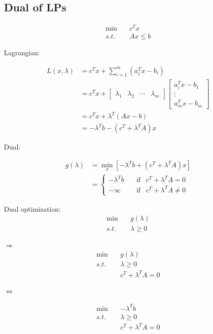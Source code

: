 

\subsection{Dual of LPs}

\begin{align*}
\min\quad &c^Tx\\
s.t.\quad &Ax\leq b
\end{align*}

Lagrangian: 

\begin{align*}
L(x,\lambda) &= c^Tx + \sum^m_{i=1}(a_i^Tx-b_i)\\
&= c^Tx+\begin{bmatrix}
\lambda_1&\lambda_2&\cdots&\lambda_m
\end{bmatrix}\begin{bmatrix}
a_i^Tx-b_1\\
\vdots\\
a_m^Tx-b_m
\end{bmatrix} \\
&=c^Tx+\lambda^T(Ax-b)\\
&= -\lambda^Tb-(c^T+\lambda^TA)x
\end{align*}

Dual:

\begin{align*}
g(\lambda) &= \min_x[-\lambda^Tb+(c^T+\lambda^TA)x]\\
&=
\label{eq6}
\left\{
\begin{aligned}
-\lambda^Tb &\quad \text{if} & c^T+\lambda^TA=0 \\
-\infty &\quad \text{if} & c^T+\lambda^TA\neq 0
\end{aligned}
\right.
\end{align*}

Dual optimization:
\begin{align*}
\min\quad &g(\lambda)\\
s.t.\quad &\lambda \geq 0
\end{align*}

$\Rightarrow$
\begin{align*}
\min\quad &g(\lambda)\\
s.t.\quad &\lambda\geq 0\\
&c^T+\lambda^TA=0
\end{align*}

$\Leftrightarrow$

\begin{align*}
\min\quad &-\lambda^Tb\\
s.t.\quad &\lambda\geq 0\\
&c^T+\lambda^TA=0
\end{align*}






